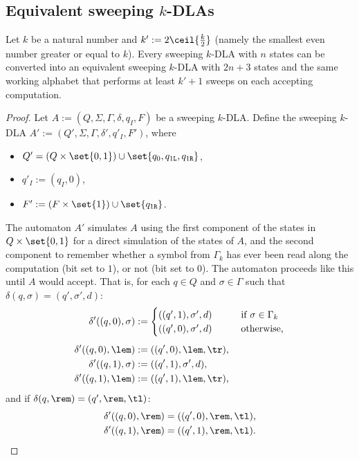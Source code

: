 \subsection{Equivalent sweeping \texorpdfstring{$k$}{k}-DLAs}
\begin{thrm}\label{thm:equiv-swep-dla}
	Let $k$ be a natural number and $k':=2\ceil{\frac{k}{2}}$ (namely the smallest even number greater or equal to $k$).
	Every sweeping $k$-DLA with $n$ states can be converted into an equivalent sweeping $k$-DLA with $2n+3$ states and the same working alphabet that performs at least $k'+1$ sweeps on each accepting computation.
\end{thrm}
\begin{proof}
	\newcommand{\ql}{q_{1\mathtt{L}}}
	\newcommand{\qr}{q_{1\mathtt{R}}}

	Let $A:=(Q,\Sigma,\Gamma,\delta,q_I,F)$ be a sweeping $k$-DLA.
	Define the sweeping $k$-DLA $A':=(Q',\Sigma,\Gamma,\delta',q'_I,F')$, where
	\begin{itemize}
		\item $Q'=(Q\times\set{0,1})\cup\set{q_0,\ql,\qr}$,
		\item $q'_I:=(q_I,0)$,
		\item $F':=(F\times\set{1})\cup\set{\qr}$.
	\end{itemize}

	The automaton $A'$ simulates $A$ using the first component of the states in $Q\times\set{0,1}$ for a direct simulation of the states of $A$, and the second component to remember whether a symbol from $\Gamma_k$ has ever been read along the computation (bit set to $1$), or not (bit set to $0$).
	The automaton proceeds like this until $A$ would accept.
	That is, for each $q\in Q$ and $\sigma\in\Gamma$ such that $\delta(q,\sigma)=(q',\sigma',d)$:
	\begin{align*}
		\delta'((q,0),\sigma) & :=\begin{cases}
			                          ((q',1),\sigma',d) \qquad & \text{if }\sigma\in\Gamma_k \\
			                          ((q',0),\sigma',d) \qquad & \text{otherwise,}
		                          \end{cases} \\[1ex]
		\delta'((q,0),\lem)   & :=((q',0),\lem,\tr) \text,                                \\
		\delta'((q,1),\sigma) & :=((q',1),\sigma',d) \text,                               \\
		\delta'((q,1),\lem)   & :=((q',1),\lem,\tr) \text,
	\end{align*}
	and if $\delta(q,\rem)=(q',\rem,\tl)$:
	\begin{align*}
		\delta'((q,0),\rem) & =((q',0),\rem,\tl) \text, \\
		\delta'((q,1),\rem) & =((q',1),\rem,\tl) \text.
	\end{align*}


\end{proof}
